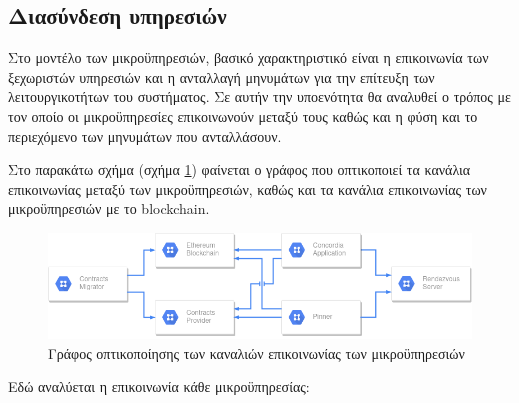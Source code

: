 \subsection{Διασύνδεση υπηρεσιών} \label{subsection:4-3-8-service-communication}

Στο μοντέλο των μικροϋπηρεσιών, βασικό χαρακτηριστικό είναι η επικοινωνία των ξεχωριστών υπηρεσιών και η ανταλλαγή μηνυμάτων για την επίτευξη των λειτουργικοτήτων του συστήματος. Σε αυτήν την υποενότητα θα αναλυθεί ο τρόπος με τον οποίο οι μικροϋπηρεσίες επικοινωνούν μεταξύ τους καθώς και η φύση και το περιεχόμενο των μηνυμάτων που ανταλλάσουν.

Στο παρακάτω σχήμα (σχήμα \ref{figure:4-3-communications-graph}) φαίνεται ο γράφος που οπτικοποιεί τα κανάλια επικοινωνίας μεταξύ των μικροϋπηρεσιών, καθώς και τα κανάλια επικοινωνίας των μικροϋπηρεσιών με το blockchain.

\begin{figure}[H]
    \centering
    \includegraphics[width=.9\textwidth]{assets/figures/chapter-4/4.3.communications-diagram.png}
    \caption{Γράφος οπτικοποίησης των καναλιών επικοινωνίας των μικροϋπηρεσιών}
    \label{figure:4-3-communications-graph}
\end{figure}

Εδώ αναλύεται η επικοινωνία κάθε μικροϋπηρεσίας:

